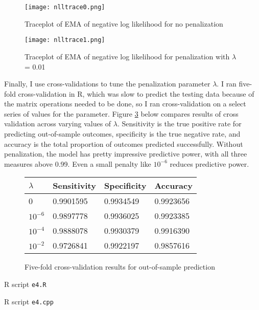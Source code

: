 \documentclass{article}
\begin{document}
\begin{figure}[htp!]
	\centering
	\texttt{[image: nlltrace0.png]}
	\caption{Traceplot of EMA of negative log likelihood for no penalization} \label{nll0}
\end{figure}

\begin{figure}[htp!]
	\centering
	\texttt{[image: nlltrace1.png]}
	\caption{Traceplot of EMA of negative log likelihood for penalization with $\lambda$ = 0.01} \label{nll1}
\end{figure}

Finally, I use cross-validations to tune the penalization parameter $\lambda$. I ran five-fold cross-validation in R, which was slow to predict the testing data because of the matrix operations needed to be done, so I ran cross-validation on a select series of values for the parameter. Figure \ref{table1} below compares results of cross validation across varying values of $\lambda$. Sensitivity is the true positive rate for predicting out-of-sample outcomes, specificity is the true negative rate, and accuracy is the total proportion of outcomes predicted successfully. Without penalization, the model has pretty impressive predictive power, with all three measures above 0.99. Even a small penalty like $10^{-6}$ reduces predictive power. 

\begin{figure}
	\centering
    \begin{tabular}{l|l|l|l}
    $\lambda$  & Sensitivity & Specificity & Accuracy  \\ \hline
    0         & 0.9901595   & 0.9934549   & 0.9923656 \\
    $10^{-6}$ & 0.9897778   & 0.9936025   & 0.9923385 \\
    $10^{-4}$ & 0.9888078   & 0.9930379   & 0.9916390 \\
    $10^{-2}$ & 0.9726841   & 0.9922197   & 0.9857616 \\
    \end{tabular}
	\caption{Five-fold cross-validation results for out-of-sample prediction} \label{table1}
\end{figure}




\pagebreak
R script \texttt{e4.R}


\pagebreak
R script \texttt{e4.cpp}


\end{document}
